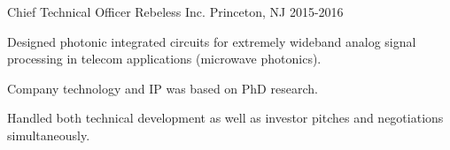 \begin{cventries}
  \cventry
    {Chief Technical Officer} %
    {Rebeless Inc.}
    {Princeton, NJ} %
    {2015-2016} %
    {
      \begin{cvitems} %
        \item {Designed photonic integrated circuits for extremely wideband analog signal processing in telecom applications (microwave photonics).}
        \item {Company technology and IP was based on PhD research.}
        \item {Handled both technical development as well as investor pitches and negotiations simultaneously.}
      \end{cvitems}
    }

\end{cventries}
